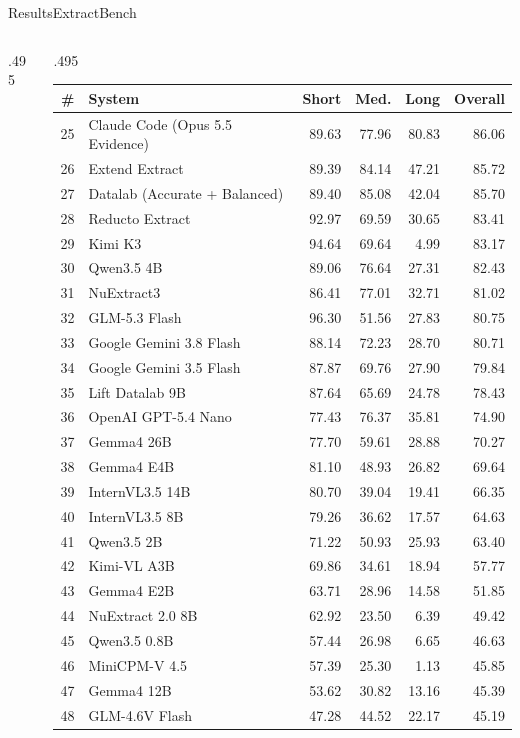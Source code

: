 \documentclass[aspectratio=1610,11pt]{beamer}
\begin{document}
\begin{frame}{Results\quad ExtractBench}
{\begin{columns}[T]
\begin{column}{.495\linewidth}
\begin{tabularx}{\linewidth}{@{}rXrrrr@{}}
\bottomrule\end{tabularx}
\end{column}
\begin{column}{.495\linewidth}
\begin{tabularx}{\linewidth}{@{}rXrrrr@{}}\toprule
\# & System & Short & Med. & Long & Overall\\\midrule
25 & Claude Code (Opus 5.5 Evidence) & 89.63 & 77.96 & 80.83 & 86.06 \\
26 & Extend Extract & 89.39 & 84.14 & 47.21 & 85.72 \\
27 & Datalab (Accurate + Balanced) & 89.40 & 85.08 & 42.04 & 85.70 \\
28 & Reducto Extract & 92.97 & 69.59 & 30.65 & 83.41 \\
29 & Kimi K3 & 94.64 & 69.64 & 4.99 & 83.17 \\
30 & Qwen3.5 4B & 89.06 & 76.64 & 27.31 & 82.43 \\
31 & NuExtract3 & 86.41 & 77.01 & 32.71 & 81.02 \\
32 & GLM-5.3 Flash & 96.30 & 51.56 & 27.83 & 80.75 \\
33 & Google Gemini 3.8 Flash & 88.14 & 72.23 & 28.70 & 80.71 \\
34 & Google Gemini 3.5 Flash & 87.87 & 69.76 & 27.90 & 79.84 \\
35 & Lift Datalab 9B & 87.64 & 65.69 & 24.78 & 78.43 \\
36 & OpenAI GPT-5.4 Nano & 77.43 & 76.37 & 35.81 & 74.90 \\
37 & Gemma4 26B & 77.70 & 59.61 & 28.88 & 70.27 \\
38 & Gemma4 E4B & 81.10 & 48.93 & 26.82 & 69.64 \\
39 & InternVL3.5 14B & 80.70 & 39.04 & 19.41 & 66.35 \\
40 & InternVL3.5 8B & 79.26 & 36.62 & 17.57 & 64.63 \\
41 & Qwen3.5 2B & 71.22 & 50.93 & 25.93 & 63.40 \\
42 & Kimi-VL A3B & 69.86 & 34.61 & 18.94 & 57.77 \\
43 & Gemma4 E2B & 63.71 & 28.96 & 14.58 & 51.85 \\
44 & NuExtract 2.0 8B & 62.92 & 23.50 & 6.39 & 49.42 \\
45 & Qwen3.5 0.8B & 57.44 & 26.98 & 6.65 & 46.63 \\
46 & MiniCPM-V 4.5 & 57.39 & 25.30 & 1.13 & 45.85 \\
47 & Gemma4 12B & 53.62 & 30.82 & 13.16 & 45.39 \\
48 & GLM-4.6V Flash & 47.28 & 44.52 & 22.17 & 45.19 \\


\end{tabularx}
\end{column}
\end{columns}}
\end{frame}
\end{document}

